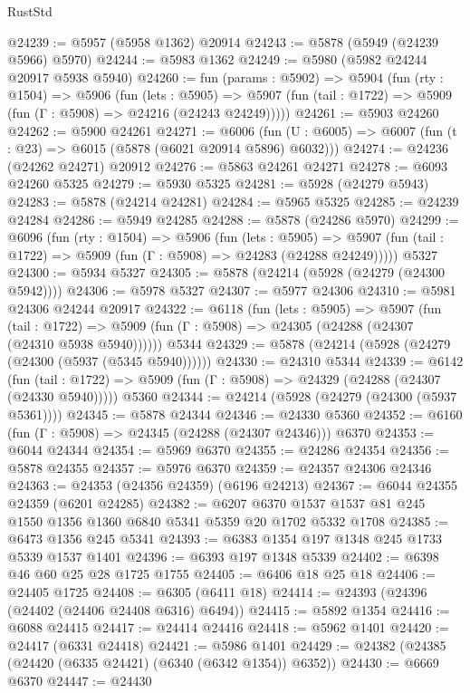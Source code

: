 \begin{lexlean}{RustStd}
\begin{coremodule}
@24239 := @5957 (@5958 @1362) @20914
@24243 := @5878 (@5949 (@24239 @5966) @5970)
@24244 := @5983 @1362
@24249 := @5980 (@5982 @24244 @20917 @5938 @5940)
@24260 := fun (params : @5902) =>
  @5904
    (fun (rty : @1504) =>
    @5906
      (fun (lets : @5905) =>
      @5907 (fun (tail : @1722) => @5909 (fun (Γ : @5908) => @24216 (@24243 @24249)))))
@24261 := @5903 @24260
@24262 := @5900 @24261
@24271 := @6006
    (fun (U : @6005) => @6007 (fun (t : @23) => @6015 (@5878 (@6021 @20914 @5896) @6032)))
@24274 := @24236 (@24262 @24271) @20912
@24276 := @5863 @24261 @24271
@24278 := @6093 @24260 @5325
@24279 := @5930 @5325
@24281 := @5928 (@24279 @5943)
@24283 := @5878 (@24214 @24281)
@24284 := @5965 @5325
@24285 := @24239 @24284
@24286 := @5949 @24285
@24288 := @5878 (@24286 @5970)
@24299 := @6096
    (fun (rty : @1504) =>
    @5906
      (fun (lets : @5905) =>
      @5907 (fun (tail : @1722) => @5909 (fun (Γ : @5908) => @24283 (@24288 @24249)))))
    @5327
@24300 := @5934 @5327
@24305 := @5878 (@24214 (@5928 (@24279 (@24300 @5942))))
@24306 := @5978 @5327
@24307 := @5977 @24306
@24310 := @5981 @24306 @24244 @20917
@24322 := @6118
    (fun (lets : @5905) =>
    @5907
      (fun (tail : @1722) =>
      @5909 (fun (Γ : @5908) => @24305 (@24288 (@24307 (@24310 @5938 @5940))))))
    @5344
@24329 := @5878 (@24214 (@5928 (@24279 (@24300 (@5937 (@5345 @5940))))))
@24330 := @24310 @5344
@24339 := @6142
    (fun (tail : @1722) => @5909 (fun (Γ : @5908) => @24329 (@24288 (@24307 (@24330 @5940)))))
    @5360
@24344 := @24214 (@5928 (@24279 (@24300 (@5937 @5361))))
@24345 := @5878 @24344
@24346 := @24330 @5360
@24352 := @6160 (fun (Γ : @5908) => @24345 (@24288 (@24307 @24346))) @6370
@24353 := @6044 @24344
@24354 := @5969 @6370
@24355 := @24286 @24354
@24356 := @5878 @24355
@24357 := @5976 @6370
@24359 := @24357 @24306 @24346
@24363 := @24353 (@24356 @24359) (@6196 @24213)
@24367 := @6044 @24355 @24359 (@6201 @24285)
@24382 := @6207 @6370 @1537 @1537 @81 @245 @1550 @1356 @1360 @6840 @5341 @5359 @20 @1702 @5332 @1708
@24385 := @6473 @1356 @245 @5341
@24393 := @6383 @1354 @197 @1348 @245 @1733 @5339 @1537 @1401
@24396 := @6393 @197 @1348 @5339
@24402 := @6398 @46 @60 @25 @28 @1725 @1755
@24405 := @6406 @18 @25 @18
@24406 := @24405 @1725
@24408 := @6305 (@6411 @18)
@24414 := @24393 (@24396 (@24402 (@24406 @24408 @6316) @6494))
@24415 := @5892 @1354
@24416 := @6088 @24415
@24417 := @24414 @24416
@24418 := @5962 @1401
@24420 := @24417 (@6331 @24418)
@24421 := @5986 @1401
@24429 := @24382 (@24385 (@24420 (@6335 @24421) (@6340 (@6342 @1354)) @6352))
@24430 := @6669 @6370
@24447 := @24430

\end{coremodule}
\end{lexlean}
